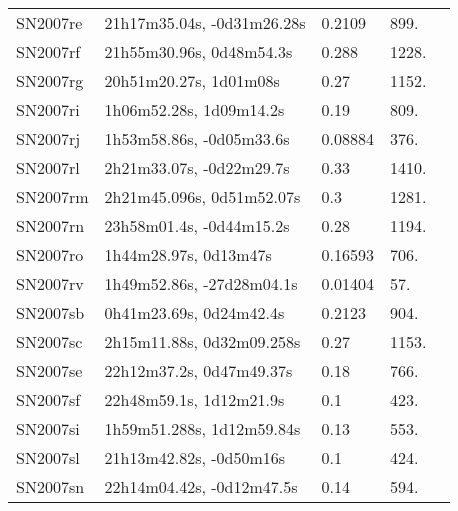\begin{longtable}{lllll}
         SN2007re &     21h17m35.04s, -0d31m26.28s &   0.2109 &           899. &    \citet{2011ApJ...740...92G} \\
         SN2007rf &       21h55m30.96s, 0d48m54.3s &    0.288 &          1228. &    \citet{2011ApJ...740...92G} \\
         SN2007rg &         20h51m20.27s, 1d01m08s &     0.27 &          1152. &    \citet{2007CBET.1167A...1B} \\
         SN2007ri &        1h06m52.28s, 1d09m14.2s &     0.19 &           809. &    \citet{2007CBET.1146A...1B} \\
         SN2007rj &       1h53m58.86s, -0d05m33.6s &  0.08884 &           376. &    \citet{2016SDSSD.C...0000:} \\
         SN2007rl &       2h21m33.07s, -0d22m29.7s &     0.33 &          1410. &    \citet{2007CBET.1146A...1B} \\
         SN2007rm &      2h21m45.096s, 0d51m52.07s &      0.3 &          1281. &    \citet{2007CBET.1146A...1B} \\
         SN2007rn &       23h58m01.4s, -0d44m15.2s &     0.28 &          1194. &    \citet{2007CBET.1146A...1B} \\
         SN2007ro &          1h44m28.97s, 0d13m47s &  0.16593 &           706. &    \citet{2016SDSSD.C...0000:} \\
         SN2007rv &      1h49m52.86s, -27d28m04.1s &  0.01404 &            57. &    \citet{1996ApJS..107...97M} \\
         SN2007sb &        0h41m23.69s, 0d24m42.4s &   0.2123 &           904. &    \citet{2011ApJ...740...92G} \\
         SN2007sc &      2h15m11.88s, 0d32m09.258s &     0.27 &          1153. &    \citet{2007CBET.1167A...1B} \\
         SN2007se &       22h12m37.2s, 0d47m49.37s &     0.18 &           766. &    \citet{2007CBET.1167A...1B} \\
         SN2007sf &        22h48m59.1s, 1d12m21.9s &      0.1 &           423. &    \citet{2007CBET.1167A...1B} \\
         SN2007si &      1h59m51.288s, 1d12m59.84s &     0.13 &           553. &    \citet{2007CBET.1167A...1B} \\
         SN2007sl &        21h13m42.82s, -0d50m16s &      0.1 &           424. &    \citet{2007CBET.1167A...1B} \\
         SN2007sn &      22h14m04.42s, -0d12m47.5s &     0.14 &           594. &    \citet{2007CBET.1167A...1B} \\

\end{longtable}
